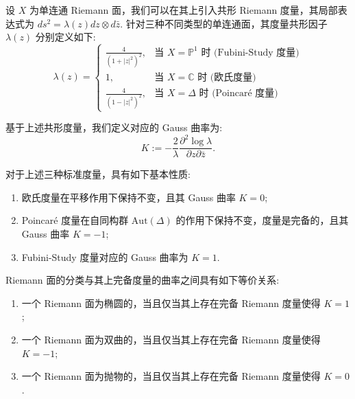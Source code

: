 设 $X$ 为单连通 Riemann 面，我们可以在其上引入共形 Riemann 度量，其局部表达式为 $ds^2 = \lambda(z) dz \otimes d\bar{z}$. 针对三种不同类型的单连通面，其度量共形因子 $\lambda(z)$ 分别定义如下:
\[
\lambda(z) = 
\begin{cases} 
\frac{4}{(1+|z|^2)^2}, & \text{当 } X = \mathbb{P}^1 \text{ 时 (Fubini-Study 度量)} \\[1ex]
1, & \text{当 } X = \mathbb{C} \text{ 时 (欧氏度量)} \\[1ex]
\frac{4}{(1-|z|^2)^2}, & \text{当 } X = \Delta \text{ 时 (Poincar\'e 度量)} 
\end{cases}
\]

基于上述共形度量，我们定义对应的 Gauss 曲率为:
\[ K := -\frac{2}{\lambda} \frac{\partial^2 \log \lambda}{\partial z \partial \bar{z}}. \]

\begin{theorem}
对于上述三种标准度量，具有如下基本性质:
\begin{enumerate}
    \item 欧氏度量在平移作用下保持不变，且其 Gauss 曲率 $K = 0$;
    \item Poincar\'e 度量在自同构群 $\mathrm{Aut}(\Delta)$ 的作用下保持不变，度量是完备的，且其 Gauss 曲率 $K = -1$;
    \item Fubini-Study 度量对应的 Gauss 曲率为 $K = 1$.
\end{enumerate}
\end{theorem}

\begin{corollary}
Riemann 面的分类与其上完备度量的曲率之间具有如下等价关系:
\begin{enumerate}
    \item 一个 Riemann 面为椭圆的，当且仅当其上存在完备 Riemann 度量使得 $K=1$;
    \item 一个 Riemann 面为双曲的，当且仅当其上存在完备 Riemann 度量使得 $K=-1$;
    \item 一个 Riemann 面为抛物的，当且仅当其上存在完备 Riemann 度量使得 $K=0$.
\end{enumerate}
\end{corollary}

